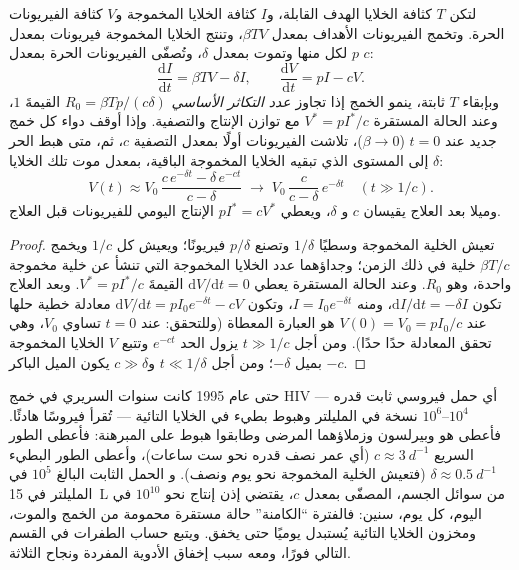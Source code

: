\begin{theorem}\label{thm:b3:virology:dynamics}
لتكن $T$ كثافة الخلايا الهدف القابلة، و$I$ كثافة الخلايا المخموجة
و$V$ كثافة الفيريونات الحرة. وتخمج الفيريونات الأهداف بمعدل $\beta TV$،
وتنتج الخلايا المخموجة فيريونات بمعدل $p$ لكل منها وتموت بمعدل
$\delta$، وتُصفّى الفيريونات الحرة بمعدل $c$:
\[
\frac{\mathrm{d}I}{\mathrm{d}t} = \beta TV - \delta I, \qquad
\frac{\mathrm{d}V}{\mathrm{d}t} = pI - cV .
\]
وبإبقاء $T$ ثابتة، ينمو الخمج إذا تجاوز \emph{عدد التكاثر
الأساسي} $R_{0} = \beta Tp/(c\delta)$ القيمةَ $1$، وعند
الحالة المستقرة $V^{*} = p I^{*}/c$ مع توازن الإنتاج والتصفية.
وإذا أوقف دواء كل خمج جديد عند $t = 0$ ($\beta \to 0$)، تلاشت
الفيريونات أولًا بمعدل التصفية $c$، ثم، متى هبط 
الحر إلى المستوى الذي تبقيه الخلايا المخموجة الباقية، بمعدل
موت تلك الخلايا $\delta$:
\[
V(t) \approx V_{0}\,\frac{c\,e^{-\delta t} - \delta\,e^{-ct}}{c - \delta}
\;\longrightarrow\; V_{0}\,\frac{c}{c-\delta}\,e^{-\delta t}
\quad (t \gg 1/c).
\]
وميلا  بعد العلاج يقيسان $c$ و
$\delta$، ويعطي $pI^{*} = cV^{*}$ الإنتاج اليومي للفيريونات
قبل العلاج.
\end{theorem}
\begin{proof}
تعيش الخلية المخموجة وسطيًا $1/\delta$ وتصنع $p/\delta$
فيريونًا؛ ويعيش كل  $1/c$ ويخمج $\beta T/c$ خلية في ذلك
الزمن؛ وجداؤهما عدد الخلايا المخموجة التي تنشأ عن خلية مخموجة
واحدة، وهو $R_{0}$. وعند الحالة المستقرة يعطي $\mathrm{d}V/\mathrm{d}t = 0$
القيمةَ $V^{*} = pI^{*}/c$. وبعد العلاج تكون $\mathrm{d}I/\mathrm{d}t =
-\delta I$، ومنه $I = I_{0}e^{-\delta t}$، وتكون $\mathrm{d}V/\mathrm{d}t =
pI_{0}e^{-\delta t} - cV$ معادلة خطية حلها عند
$V(0) = V_{0} = pI_{0}/c$ هو العبارة المعطاة (وللتحقق: عند $t = 0$
تساوي $V_{0}$، وهي تحقق المعادلة حدًا حدًا). ومن أجل $t
\gg 1/c$ يزول الحد $e^{-ct}$ وتتبع $V$ الخلايا المخموجة
بميل $-\delta$؛ ومن أجل $t \ll 1/\delta$ و$c \gg \delta$ يكون الميل
الباكر $-c$.
\end{proof}

\begin{example}\label{ex:b3:virology:hiv}
حتى عام 1995 كانت سنوات  السريري في خمج HIV --- أي حمل
فيروسي ثابت قدره $10^{4}$--$10^{6}$ نسخة في المليلتر وهبوط بطيء في
الخلايا التائية --- تُقرأ فيروسًا هادئًا. فأعطى هو وبيرلسون وزملاؤهما
المرضى  وطابقوا هبوط  على المبرهنة: فأعطى الطور السريع $c \approx \qty{3}{d^{-1}}$
(أي عمر نصف  قدره نحو ست ساعات)، وأعطى الطور البطيء $\delta \approx
\qty{0.5}{d^{-1}}$ (فتعيش الخلية المخموجة نحو يوم ونصف). و
الحمل الثابت البالغ $10^{5}$ في المليلتر في \qty{15}{L} من سوائل الجسم،
المصفّى بمعدل $c$، يقتضي إذن إنتاج نحو $10^{10}$
 في اليوم، كل يوم، سنين: فالفترة ``الكامنة''
حالة مستقرة محمومة من الخمج والموت، ومخزون الخلايا التائية
يُستبدل يوميًا حتى يخفق. ويتبع حساب الطفرات في القسم
التالي فورًا، ومعه سبب إخفاق الأدوية المفردة
ونجاح الثلاثة.
\end{example}

